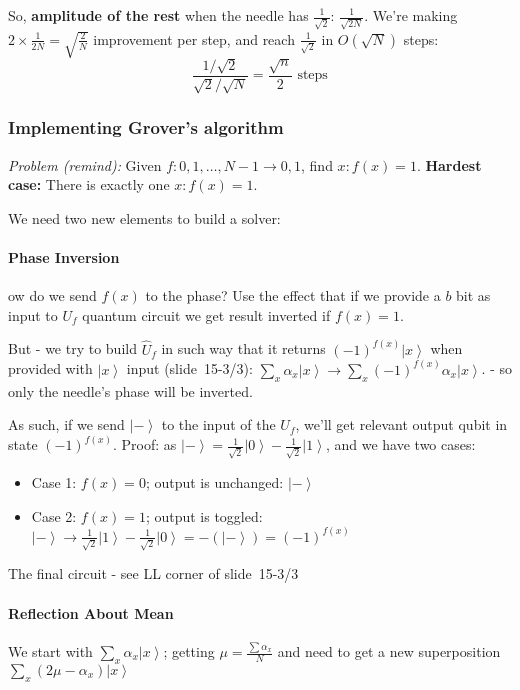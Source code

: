\documentclass{scrartcl}
\newcommand{\ket}[1]{\left| #1 \right>} %
\newcommand{\hqrt}{\frac1{\sqrt2}} %
\newcommand{\slide}[2]{slide~#1/#2} %
\newcommand{\video}[2]{ } %
\begin{document}
So, {\bf amplitude of the rest} when the needle has $\frac1{\sqrt2}$:
$\frac1{\sqrt{2N}}$. We're making $2 \times \frac1{2N} = \sqrt{\frac2N}$
improvement per step, and reach $\frac1{\sqrt2}$ in $O(\sqrt N)$ steps:
$$\frac{1/{\sqrt2}}{\sqrt2/{\sqrt N}} = \frac{\sqrt n}{2} \text{ steps}$$

\subsubsection{Implementing Grover's algorithm}
\label{sec:GroverImplmenting}

{\it Problem (remind):} Given $f:{0, 1, \dots , N-1} \to {0, 1}$, find $x:f(x) =
1$. {\bf Hardest case:} There is exactly one $x: f(x) = 1$.

We need two new elements to build a solver:

\paragraph{Phase Inversion} 
\video{15-3}

How do we send $f(x)$ to the phase? Use the effect that if we provide a $b$ bit
as input to $U_f$ quantum circuit we get result inverted if $f(x) = 1$. 
\video{15-3}{02:00}

But - we try to build $\hat U_f$ in such way that it returns $(-1)^{f(x)}\ket x$
when provided with $\ket x$ input (\slide{15-3}3): $\sum_x \alpha_x \ket x \to
\sum_x (-1)^{f(x)} \alpha_x \ket x$. \video{15-3}{03:33} - so only the needle's
phase will be inverted.

As such, if we send $\ket-$ to the input of the $U_f$, we'll get relevant output
qubit in state $(-1)^{f(x)}$. Proof: as $\ket- = \hqrt \ket0 - \hqrt \ket1$, and
we have two cases:
\begin{itemize}
\item Case 1: $f(x) = 0$; output is unchanged: $\ket-$
\item Case 2: $f(x) = 1$; output is toggled: $\ket- \to \hqrt \ket1 - \hqrt
  \ket0 = - (\ket-) = (-1)^{f(x)}$
\end{itemize}
The final circuit - see LL corner of \slide{15-3}3

\video{15-3}{07:35}
\paragraph{Reflection About Mean}

We start with $\sum_x \alpha_x \ket x$; getting $\mu = \frac{\sum \alpha_x}N$
and need to get a new superposition $\sum_x (2\mu - \alpha_x) \ket x$
\end{document}
